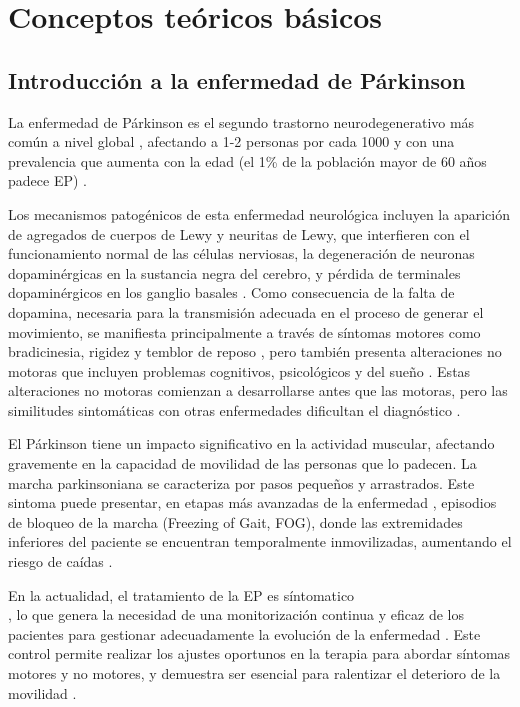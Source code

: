 
\section{Conceptos teóricos básicos}


\subsection{Introducción a la enfermedad de Párkinson}

La enfermedad de Párkinson es el segundo trastorno neurodegenerativo más común a nivel global \cite{Art2}, afectando a 1-2 personas por cada 1000 y con una prevalencia que aumenta con la edad (el 1\% de la población mayor de 60 años padece EP) \cite{Art4}.

Los mecanismos patogénicos de esta enfermedad neurológica incluyen la aparición de agregados de cuerpos de Lewy y neuritas de Lewy, que interfieren con el funcionamiento normal de las células nerviosas, la degeneración de neuronas dopaminérgicas en la sustancia negra del cerebro, y pérdida de terminales dopaminérgicos en los ganglio basales \cite{Art1}. Como consecuencia de la falta de dopamina, necesaria para la transmisión adecuada en el proceso de generar el movimiento, se manifiesta principalmente a través de síntomas motores como bradicinesia, rigidez y temblor de reposo \cite{Art4}, pero también presenta alteraciones no motoras que incluyen problemas cognitivos, psicológicos y del sueño \cite{Art5} \cite{Art6}. Estas alteraciones no motoras comienzan a desarrollarse antes que las motoras, pero las similitudes sintomáticas con otras enfermedades dificultan el diagnóstico \cite{Art1}.

El Párkinson tiene un impacto significativo en la actividad muscular, afectando gravemente en la capacidad de movilidad de las personas que lo padecen. La marcha parkinsoniana se caracteriza por pasos pequeños y arrastrados. Este sintoma puede presentar, en etapas más avanzadas de la enfermedad \cite{Art2}, episodios de bloqueo de la marcha (Freezing of Gait, FOG), donde las extremidades inferiores del paciente se encuentran temporalmente inmovilizadas, aumentando el riesgo de caídas \cite{Art5} \cite{Art6}.

En la actualidad, el tratamiento de la EP es síntomatico\\ \cite{Art6}, lo que genera la necesidad de una monitorización continua y eficaz de los pacientes para gestionar adecuadamente la evolución de la enfermedad \cite{Art3}. Este control permite realizar los ajustes oportunos en la terapia para abordar síntomas motores y no motores, y demuestra ser esencial para ralentizar el deterioro de la movilidad \cite{Art6}.

